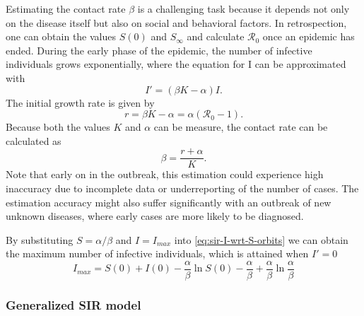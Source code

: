 Estimating the contact rate $\beta$ is a challenging task because it depends not only on the disease itself but also on social and behavioral factors.
In retrospection, one can obtain the values $S(0)$ and $S_\infty$ and calculate $\mathcal{R}_0$ once an epidemic has ended.
During the early phase of the epidemic, the number of infective individuals grows exponentially, where the equation for I can be approximated with
\begin{equation*}
    I' = (\beta K - \alpha) I.
\end{equation*}
The initial growth rate is given by
\begin{equation*}
    r = \beta K - \alpha = \alpha (\mathcal{R}_0 - 1).
\end{equation*}
Because both the values $K$ and $\alpha$ can be measure, the contact rate can be calculated as
\begin{equation*}
    \beta = \frac{r + \alpha}{K}.
\end{equation*}
Note that early on in the outbreak, this estimation could experience high inaccuracy due to incomplete data or underreporting of the number of cases.
The estimation accuracy might also suffer significantly with an outbreak of new unknown diseases, where early cases are more likely to be diagnosed.

By substituting $S = \alpha / \beta$ and $I = I_{max}$ into \autoref{eq:sir-I-wrt-S-orbits} we can obtain the maximum number of infective individuals, which is attained when $I' = 0$
\begin{equation*}
    I_{max} = S(0) + I(0) - \frac{\alpha}{\beta} \ln S(0) - \frac{\alpha}{\beta} + \frac{\alpha}{\beta} \ln \frac{\alpha}{\beta}
\end{equation*}

\subsubsection{Generalized SIR model}


